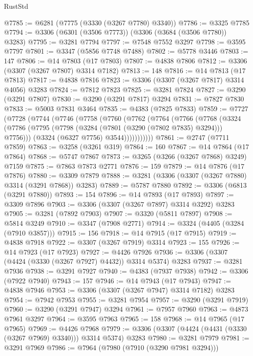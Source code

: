 \begin{lexlean}{RustStd}
\begin{coremodule}
@7785 := @6281 (@7775 (@3330 (@3267 @7780) @3340))
@7786 := @3325 @7785
@7794 := @3306 (@6301 (@3506 @7773)) (@3306 (@3684 (@3506 @7780)) @3283)
@7795 := @3281 @7794
@7797 := @7548 @7552 @3297
@7798 := @3595 @7797
@7801 := @3347 (@5856 @7748 @7488)
@7802 := @5778 @3446
@7803 := 147
@7806 := @14 @7803 (@17 @7803)
@7807 := @4838 @7806
@7812 := @3306 (@3307 (@3267 @7807) @3314 @7182)
@7813 := 148
@7816 := @14 @7813 (@17 @7813)
@7817 := @4838 @7816
@7823 := @3306 (@3307 (@3267 @7817) @3314 @4056) @3283
@7824 := @7812 @7823
@7825 := @3281 @7824
@7827 := @3290 (@3291 @7807)
@7830 := @3290 (@3291 @7817) @3294
@7831 := @7827 @7830
@7833 := @5003 @7831 @3464
@7835 := @4383 (@7825 @7833)
@7859 := @7727
    (@7728
      (@7744
        (@7746
          (@7758
            (@7760
              (@7762
                (@7764
                  (@7766
                    (@7768
                      (@3324
                        (@7786 (@7795 (@7798 (@3284 (@7801 (@3290 (@7802 @7835) @3294))) @7756)))
                        (@3324 (@6327 @7756) @3544)))))))))))
@7861 := @2747 (@7711 @7859)
@7863 := @3258 (@3261 @319)
@7864 := 160
@7867 := @14 @7864 (@17 @7864)
@7868 := @5747 @7867
@7873 := @3265 (@3266 (@3267 @7868) @3249) @7159
@7875 := @7863 @7873 @2771
@7876 := 159
@7879 := @14 @7876 (@17 @7876)
@7880 := @3309 @7879
@7888 := @3281 (@3306 (@3307 (@3267 @7880) @3314 (@3291 @7868)) @3283)
@7889 := @5787 @7880
@7892 := @3306 (@6813 (@3291 @7880))
@7893 := 154
@7896 := @14 @7893 (@17 @7893)
@7897 := @3309 @7896
@7903 := @3306 (@3307 (@3267 @7897) @3314 @3292) @3283
@7905 := @3281 (@7892 @7903)
@7907 := @3320 (@5811 @7897)
@7908 := @5814 @3249
@7910 := @3347 (@7908 @2771)
@7914 := @3324 (@4405 (@3284 (@7910 @3857)))
@7915 := 156
@7918 := @14 @7915 (@17 @7915)
@7919 := @4838 @7918
@7922 := @3307 (@3267 @7919) @3314
@7923 := 155
@7926 := @14 @7923 (@17 @7923)
@7927 := @4426 @7926
@7936 := @3306 (@3307 (@4424 (@3330 (@3267 @7927) @4432)) @3314 @5374) @3283
@7937 := @3281 @7936
@7938 := @3291 @7927
@7940 := @4383 (@7937 @7938)
@7942 := @3306 (@7922 @7940)
@7943 := 157
@7946 := @14 @7943 (@17 @7943)
@7947 := @4838 @7946
@7953 := @3306 (@3307 (@3267 @7947) @3314 @7182) @3283
@7954 := @7942 @7953
@7955 := @3281 @7954
@7957 := @3290 (@3291 @7919)
@7960 := @3290 (@3291 @7947) @3294
@7961 := @7957 @7960
@7963 := @4873 @7961 @3297
@7964 := @3595 @7963
@7965 := 158
@7968 := @14 @7965 (@17 @7965)
@7969 := @4426 @7968
@7979 := @3306 (@3307 (@4424 (@4431 (@3330 (@3267 @7969) @3340))) @3314 @5374) @3283
@7980 := @3281 @7979
@7981 := @3291 @7969
@7986 := @7964 (@7980 (@7910 (@3290 @7981 @3294)))

\end{coremodule}
\end{lexlean}
